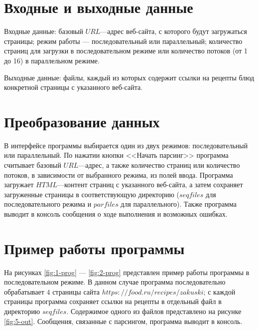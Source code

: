 \chapter{Входные и выходные данные}

Входные данные: базовый $URL$---адрес веб-сайта, с которого будут загружаться страницы; режим работы --- последовательный или параллельный; количество страниц для загрузки в последовательном режиме или количество потоков (от 1 до 16) в параллельном режиме.

Выходные данные: файлы, каждый из которых содержит ссылки на рецепты блюд конкретной страницы с указанного веб-сайта.

\chapter{Преобразование данных}

В интерфейсе программы выбирается один из двух режимов: последовательный или параллельный. По нажатии кнопки <<Начать парсинг>> программа считывает базовый $URL$---адрес, а также количество страниц или количество потоков, в зависимости от выбранного режима, из полей ввода. Программа загружает $HTML$---контент страниц с указанного веб-сайта, а затем сохраняет загруженные страницы в соответствующую директорию ($seqfiles$ для последовательного режима и $parfiles$ для параллельного). Также программа выводит в консоль сообщения о ходе выполнения и возможных ошибках.

\chapter{Пример работы программы}

На рисунках \ref{fig:1-prog} --- \ref{fig:2-prog} представлен пример работы программы в последовательном режиме. В данном случае программа последовательно обрабатывает $4$ страницы сайта $https://food.ru/recipes/zakuski$; с каждой страницы программа сохраняет ссылки на рецепты в отдельный файл в директорию $seqfiles$. Содержимое одного из файлов представлено на рисунке \ref{fig:5-out}. Сообщения, связанные с парсингом, программа выводит в консоль.

\clearpage

